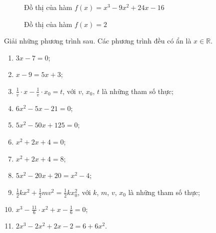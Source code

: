 \begin{figure}[H]
   \centering
   \begin{minipage}[t]{0.48\textwidth}
      \centering
      \caption{Đồ thị của hàm $f(x) = x^3 - 9x^2 + 24x - 16$}
      \label{fig:ham_so_mot_bien:da_thuc:x3_t9x2_24x_t16}
   \end{minipage}
   \hfill
   \begin{minipage}[t]{0.48\textwidth}
      \centering
      \caption{Đồ thị của hàm $f(x) = 2$}
      \label{fig:ham_so:ham_da_thuc:2}
   \end{minipage}
\end{figure}

\exercise Giải những phương trình sau. Các phương trình đều có ẩn là $x \in \mathbb{R}$.
\begin{multicols}{2}
   \begin{enumerate}
      \item $3x - 7 = 0$;
      \item $x - 9 = 5x + 3$;
      \item $\frac{1}{v}\cdot x - \frac{1}{v} \cdot x_0 = t$, với $v$, $x_0$, $t$ là những tham số thực;
      \item $6x^2 - 5x - 21 = 0$;
      \item $5x^2 - 50x + 125 = 0$;
      \item $x^2 + 2x + 4 = 0$;
      \item $x^2 + 2x + 4 = 8$;
      \item $5x^2 - 20x + 20 = x^2 - 4$;
      \item $\frac{1}{2}kx^2 + \frac{1}{2}mv^2 = \frac{1}{2}kx_0^2$, với $k$, $m$, $v$, $x_0$ là những tham số thực;
      \item $x^3 - \frac{11}{6}\cdot x^2 + x - \frac{1}{6} = 0$;
      \item $2x^3 - 2x^2 + 2x - 2 = 6 + 6x^2$.
   \end{enumerate}
\end{multicols}

